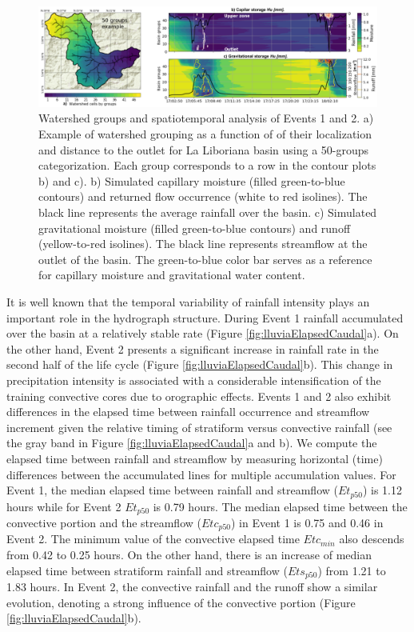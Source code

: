 \documentclass[hess, manuscript]{copernicus}
\begin{document}
\begin{figure}[t!]
\centering
 \includegraphics[width=16cm]{Figures/Figure_9_10.png}
 \caption{Watershed groups and spatiotemporal analysis of Events 1 and 2.  a) Example of watershed grouping as a function of of their localization and distance to the outlet for La Liboriana basin using a 50-groups categorization. Each group corresponds to a row in the contour plots b) and c). b) Simulated capillary moisture (filled green-to-blue contours) and returned flow occurrence (white to red isolines).  The black line represents the average rainfall over the basin. c) Simulated gravitational moisture (filled green-to-blue contours) and runoff (yellow-to-red isolines).  The black line represents streamflow at the outlet of the basin.  The green-to-blue color bar serves as a reference for capillary moisture and gravitational water content.}
    \label{fig:HumedadSpatioTemporal}
\end{figure}

It is well known that the temporal variability of rainfall intensity plays an important role in the  hydrograph structure. During Event 1 rainfall accumulated over the basin at a relatively stable rate (Figure \ref{fig:lluviaElapsedCaudal}a).  On the other hand, Event 2 presents a significant increase in rainfall rate in the second half of the life cycle (Figure \ref{fig:lluviaElapsedCaudal}b).  This change in precipitation intensity is associated with a considerable intensification of the training convective cores due to orographic effects. Events 1 and 2 also exhibit differences in the elapsed time between rainfall occurrence and streamflow increment given the relative timing of stratiform versus convective rainfall (see the gray band in Figure \ref{fig:lluviaElapsedCaudal}a and b).  We compute the elapsed time between rainfall and streamflow by measuring horizontal (time) differences between the accumulated lines for multiple accumulation values. For Event 1, the median elapsed time between rainfall and streamflow ($Et_{p50}$) is 1.12 hours while for Event 2 $Et_{p50}$ is 0.79 hours.  The median elapsed time between the convective portion and the streamflow ($Etc_{p50}$) in Event 1 is 0.75 and 0.46 in Event 2. The minimum value of the convective elapsed time $Etc_{min}$ also descends from 0.42 to 0.25 hours.  On the other hand, there is an increase of median elapsed time between stratiform rainfall and streamflow ($Ets_{p50}$) from 1.21 to 1.83 hours.  In Event 2, the convective rainfall and the runoff show a similar evolution,  denoting a strong influence of the convective portion (Figure \ref{fig:lluviaElapsedCaudal}b).\\
\end{document}
